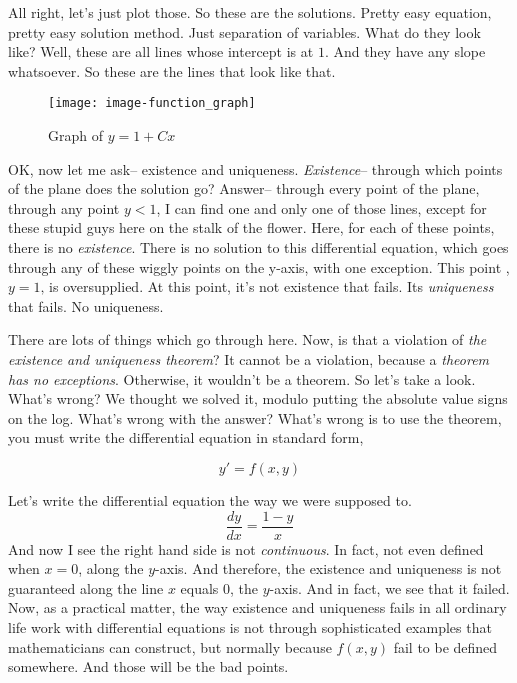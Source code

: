 All right, let's just plot those.
So these are the solutions.
Pretty easy equation, pretty easy solution method.
Just separation of variables.
What do they look like?
Well, these are all lines whose intercept is at $1$.
And they have any slope whatsoever.
So these are the lines that look like that.\\

\begin{wrapfigure}{r}{5.5cm}
  \texttt{[image: image-function\_graph]}
  \caption{Graph of $y = 1 + Cx$}
\end{wrapfigure}

OK, now let me ask-- existence and uniqueness.
\emph{Existence}-- through which points of the plane
does the solution go?
Answer-- through every point of the plane, through any point
$y < 1$, I can find one and only one of those lines,
except for these stupid guys here on the stalk of the flower.
Here, for each of these points, there is no \emph{existence}.
There is no solution to this differential equation, which
goes through any of these wiggly points on the y-axis,
with one exception.
This point ,$y = 1,\,$is oversupplied.
At this point, it's not existence that fails.
Its \emph{uniqueness} that fails. No uniqueness.

There are lots of things which go through here.
Now, is that a violation of \emph{the existence and uniqueness theorem}?
It cannot be a violation, because a \emph{theorem has no exceptions}.
Otherwise, it wouldn't be a theorem.
So let's take a look.
What's wrong? We thought we solved it, modulo putting the absolute value
signs on the log.
What's wrong with the answer?
What's wrong is to use the theorem,
you must write the differential equation in standard form,

\begin{equation*}
  y' = f(x, y)
\end{equation*}

Let's write the differential equation the way
we were supposed to.
\begin{equation*}
  \frac{dy}{dx} = \frac{1 - y}{x}
\end{equation*}
And now I see the right hand side is not \emph{continuous}.
In fact, not even defined when $x = 0$, along the $y$-axis.
And therefore, the existence and uniqueness is not guaranteed along the line $x$ equals $0$,
the $y$-axis.
And in fact, we see that it failed.
Now, as a practical matter, the way existence and uniqueness
fails in all ordinary life work with differential equations
is not through sophisticated examples
that mathematicians can construct,
but normally because $f(x,y)$ fail to be defined somewhere.
And those will be the bad points.\\

